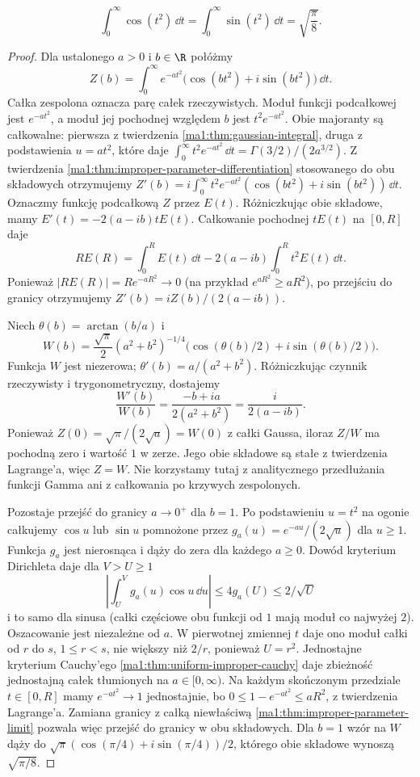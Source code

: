 \begin{twierdzenie}
\label{ma1:thm:fresnel-values}
\[
 \int_0^\infty\cos(t^2)\,\dd t
 =\int_0^\infty\sin(t^2)\,\dd t=\sqrt{\frac{\pi}{8}}.
\]
\end{twierdzenie}
\begin{proof}
Dla ustalonego $a>0$ i $b\in\R$ połóżmy
\[
 Z(b)=\int_0^\infty e^{-at^2}\big(\cos(bt^2)+i\sin(bt^2)\big)\,\dd t.
\]
Całka zespolona oznacza parę całek rzeczywistych. Moduł funkcji podcałkowej jest $e^{-at^2}$, a moduł jej pochodnej względem $b$ jest $t^2e^{-at^2}$. Obie majoranty są całkowalne: pierwsza z twierdzenia \ref{ma1:thm:gaussian-integral}, druga z podstawienia $u=at^2$, które daje $\int_0^\infty t^2e^{-at^2}\,\dd t=\Gamma(3/2)/(2a^{3/2})$. Z twierdzenia \ref{ma1:thm:improper-parameter-differentiation} stosowanego do obu składowych otrzymujemy
$Z'(b)=i\int_0^\infty t^2e^{-at^2}(\cos(bt^2)+i\sin(bt^2))\,\dd t$.
Oznaczmy funkcję podcałkową $Z$ przez $E(t)$. Różniczkując obie składowe, mamy $E'(t)=-2(a-ib)tE(t)$. Całkowanie pochodnej $tE(t)$ na $[0,R]$ daje
\[
 RE(R)=\int_0^R E(t)\,\dd t-2(a-ib)\int_0^R t^2E(t)\,\dd t.
\]
Ponieważ $|RE(R)|=Re^{-aR^2}\to0$ (na przykład $e^{aR^2}\ge aR^2$), po przejściu do granicy otrzymujemy $Z'(b)=iZ(b)/(2(a-ib))$.

Niech $\theta(b)=\arctan(b/a)$ i
\[
 W(b)=\frac{\sqrt\pi}{2}(a^2+b^2)^{-1/4}
 \big(\cos(\theta(b)/2)+i\sin(\theta(b)/2)\big).
\]
Funkcja $W$ jest niezerowa; $\theta'(b)=a/(a^2+b^2)$. Różniczkując czynnik rzeczywisty i trygonometryczny, dostajemy
\[
 \frac{W'(b)}{W(b)}=\frac{-b+ia}{2(a^2+b^2)}
 =\frac{i}{2(a-ib)}.
\]
Ponieważ $Z(0)=\sqrt\pi/(2\sqrt a)=W(0)$ z całki Gaussa, iloraz $Z/W$ ma pochodną zero i wartość $1$ w zerze. Jego obie składowe są stałe z twierdzenia Lagrange'a, więc $Z=W$. Nie korzystamy tutaj z analitycznego przedłużania funkcji Gamma ani z całkowania po krzywych zespolonych.

Pozostaje przejść do granicy $a\to0^+$ dla $b=1$. Po podstawieniu $u=t^2$ na ogonie całkujemy $\cos u$ lub $\sin u$ pomnożone przez $g_a(u)=e^{-au}/(2\sqrt u)$ dla $u\ge1$. Funkcja $g_a$ jest nierosnąca i dąży do zera dla każdego $a\ge0$. Dowód kryterium Dirichleta daje dla $V>U\ge1$
\[
 \left|\int_U^V g_a(u)\cos u\,\dd u\right|
 \le 4g_a(U)\le 2/\sqrt U
\]
i to samo dla sinusa (całki częściowe obu funkcji od $1$ mają moduł co najwyżej $2$). Oszacowanie jest niezależne od $a$. W pierwotnej zmiennej $t$ daje ono moduł całki od $r$ do $s$, $1\le r<s$, nie większy niż $2/r$, ponieważ $U=r^2$. Jednostajne kryterium Cauchy'ego \ref{ma1:thm:uniform-improper-cauchy} daje zbieżność jednostajną całek tłumionych na $a\in[0,\infty)$. Na każdym skończonym przedziale $t\in[0,R]$ mamy $e^{-at^2}\to1$ jednostajnie, bo $0\le1-e^{-at^2}\le aR^2$, z twierdzenia Lagrange'a. Zamiana granicy z całką niewłaściwą \ref{ma1:thm:improper-parameter-limit} pozwala więc przejść do granicy w obu składowych. Dla $b=1$ wzór na $W$ dąży do $\sqrt\pi(\cos(\pi/4)+i\sin(\pi/4))/2$, którego obie składowe wynoszą $\sqrt{\pi/8}$.
\end{proof}

